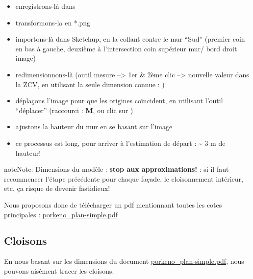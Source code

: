 \documentclass[a4paper,12pt,french]{sphinxmanual}
\begin{document}
\begin{enumerate}
\begin{itemize}
\begin{description}
\begin{itemize}
\item {} 
enregistrons-là dans 

\item {} 
transformons-la en *.png

\item {} 
importons-là dans Sketchup, en la collant contre le mur ``Sud'' (premier coin en bas à gauche, deuxième à l'intersection coin supérieur mur/ bord droit image)

\item {} 
redimensionnons-là (outil mesure --\textgreater{} 1er \& 2ème clic --\textgreater{} nouvelle valeur dans la ZCV, en utilisant la seule dimension connue : )

\item {} 
déplaçons l'image pour que les origines coïncident, en utilisant l'outil ``déplacer'' (raccourci : \textbf{M}, ou clic sur )

\item {} 
ajustons la hauteur du mur en se basant sur l'image

\item {} 
ce processus est long, pour arriver à l'estimation de départ : \textasciitilde{} 3 m de hauteur!

\end{itemize}

\end{description}

\end{itemize}

\end{enumerate}

\begin{notice}{note}{Note:}
Dimensions du modèle : \textbf{stop aux approximations!} : si il faut recommencer l'étape précédente pour chaque façade, le cloisonnement intérieur, etc. ça risque de devenir fastidieux!

Nous proposons donc de télécharger un pdf mentionnant toutes les cotes principales : \href{http://www.canopee.org/fichiers/teb-d/aides/acad/init\_su+acad/dessins/pdf/porkeno\_plans-simples\_o.turlier\_03juin09\_09h00.pdf}{porkeno\_plan-simple.pdf}
\end{notice}


\subsection{Cloisons}
\label{init_su+acad/su1:cloisons}\label{init_su+acad/su1:porkeno-plans-simples}
En nous basant sur les dimensions du document \href{http://www.canopee.org/init\_su+acad/fichiers/porkeno\_plans-simples\_o.turlier\_03juin09\_09h00.pdf}{porkeno\_plan-simple.pdf}, nous pouvons aisément tracer les cloisons.
\end{document}
